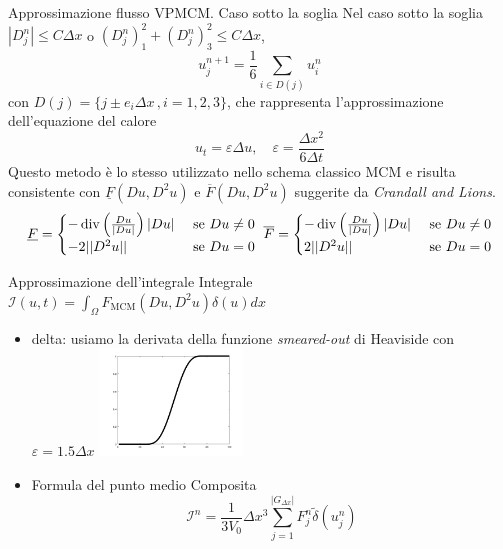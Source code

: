 \begin{frame}{Approssimazione flusso VPMCM. Caso sotto la soglia}
  Nel caso sotto la soglia $|D_j^n|\leq C\Delta x$ o
  $(D_j^n)_1^2+(D_j^n)_3^2\leq C\Delta x$, 
  \[
  u_j^{n+1}=\frac{1}{6}\sum_{i\in D(j)}u_i^n
  \]
con $D(j)=\{j\pm e_i\Delta x\,,i=1,2,3\}$, che rappresenta
l'approssimazione dell'equazione del calore
\[
u_t=\varepsilon \Delta u,\quad \varepsilon=\frac{\Delta x^2}{6\Delta t}
\]
Questo metodo è lo stesso utilizzato nello schema classico MCM e 
risulta consistente con $\underline{F}(Du,D^2u)$ e
$\overline{F}(Du,D^2u)$ suggerite da \emph{Crandall and Lions}.
\[
\underline{F}=
\begin{cases}
-\operatorname{div}\left(\frac{Du}{|Du|}\right)|Du| &\text{ se }Du\neq 0\\
-2||D^2u|| &\text{ se }Du=0
\end{cases}\,\,
\overline{F}=
\begin{cases}
-\operatorname{div}\left(\frac{Du}{|Du|}\right)|Du| &\text{ se }Du\neq 0\\
2||D^2u|| &\text{ se }Du=0
\end{cases}
\]
\end{frame}

\begin{frame}{Approssimazione dell'integrale}
  Integrale $\mathcal{I}(u,t)=\int_{\Omega}F_{\text{MCM}}(Du,D^2u)\delta(u)dx$
  \begin{itemize}
    \item delta: usiamo la derivata della funzione
      \emph{smeared-out} di Heaviside con $\varepsilon=1.5\Delta x$
      \includegraphics[width=0.3\textwidth]{graphics/heavside/heavside}
        \item Formula del punto medio Composita
          \[
          \mathcal{I}^n=\frac{1}{3V_0}\Delta x^3\sum_{j=1}^{|G_{\Delta x}|}F_j^n\tilde{\delta}(u_j^n)
          \]
  \end{itemize}
\end{frame}


